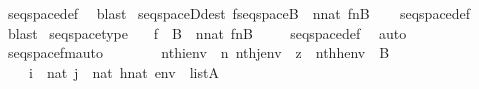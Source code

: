 \begin{isabellebody}
\ seqspace{\isacharunderscore}{\kern0pt}def\ \isamarkupfalse%
\ blast%
\endisatagproof
{\isafoldproof}%
%
\isadelimproof
\isanewline
%
\endisadelimproof
\isanewline
{}\isamarkupfalse%
\ seqspaceD{\isacharbrackleft}{\kern0pt}dest{\isacharbrackright}{\kern0pt}{\isacharcolon}{\kern0pt}\ {\isachardoublequoteopen}f{\isasymin}seqspace{\isacharparenleft}{\kern0pt}B{\isacharparenright}{\kern0pt}\ {\isasymLongrightarrow}\ {\isasymexists}n{\isasymin}nat{\isachardot}{\kern0pt}\ f{\isacharcolon}{\kern0pt}n{\isasymrightarrow}B{\isachardoublequoteclose}\isanewline
%
\isadelimproof
\ \ %
\endisadelimproof
%
\isatagproof
{}\isamarkupfalse%
\ seqspace{\isacharunderscore}{\kern0pt}def\ \isamarkupfalse%
\ blast%
\endisatagproof
{\isafoldproof}%
%
\isadelimproof
\isanewline
%
\endisadelimproof
\isanewline
{}\isamarkupfalse%
\ seqspace{\isacharunderscore}{\kern0pt}type{\isacharcolon}{\kern0pt}\ \isanewline
\ \ {\isachardoublequoteopen}f\ {\isasymin}\ B{\isacharcircum}{\kern0pt}{\isacharless}{\kern0pt}{\isasymomega}\ {\isasymLongrightarrow}\ {\isasymexists}n{\isasymin}nat{\isachardot}{\kern0pt}\ f{\isacharcolon}{\kern0pt}n{\isasymrightarrow}B{\isachardoublequoteclose}\ \isanewline
%
\isadelimproof
\ \ %
\endisadelimproof
%
\isatagproof
{}\isamarkupfalse%
\ seqspace{\isacharunderscore}{\kern0pt}def\ \isamarkupfalse%
\ auto%
\endisatagproof
{\isafoldproof}%
%
\isadelimproof
\isanewline
%
\endisadelimproof
\isanewline
{}\isamarkupfalse%
\ seqspace{\isacharunderscore}{\kern0pt}fm{\isacharunderscore}{\kern0pt}auto{\isacharcolon}{\kern0pt}\isanewline
\ \ \ \isanewline
\ \ \ \ {\isachardoublequoteopen}nth{\isacharparenleft}{\kern0pt}i{\isacharcomma}{\kern0pt}env{\isacharparenright}{\kern0pt}\ {\isacharequal}{\kern0pt}\ n{\isachardoublequoteclose}\ {\isachardoublequoteopen}nth{\isacharparenleft}{\kern0pt}j{\isacharcomma}{\kern0pt}env{\isacharparenright}{\kern0pt}\ {\isacharequal}{\kern0pt}\ z{\isachardoublequoteclose}\ \ {\isachardoublequoteopen}nth{\isacharparenleft}{\kern0pt}h{\isacharcomma}{\kern0pt}env{\isacharparenright}{\kern0pt}\ {\isacharequal}{\kern0pt}\ B{\isachardoublequoteclose}\ \isanewline
\ \ \ \ {\isachardoublequoteopen}i\ {\isasymin}\ nat{\isachardoublequoteclose}\ {\isachardoublequoteopen}j\ {\isasymin}\ nat{\isachardoublequoteclose}\ {\isachardoublequoteopen}h{\isasymin}nat{\isachardoublequoteclose}\ {\isachardoublequoteopen}env\ {\isasymin}\ list{\isacharparenleft}{\kern0pt}A{\isacharparenright}{\kern0pt}{\isachardoublequoteclose}\isanewline

\end{isabellebody}
